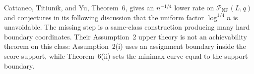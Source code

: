 Cattaneo, Titiunik, and Yu, Theorem~6, gives an \(n^{-1/4}\) lower rate on \(\mathcal P_{\mathrm{NP}}(L,q)\) and conjectures in its following discussion that the uniform factor \(\log^{1/4}n\) is unavoidable.  The missing step is a same-class construction producing many hard boundary coordinates.  Their Assumption~2 upper theory is not an achievability theorem on this class: Assumption~2(i) uses an assignment boundary inside the score support, while Theorem~6(ii) sets the minimax curve equal to the support boundary.